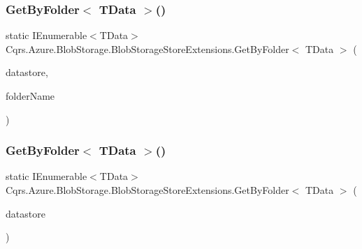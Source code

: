 \subsubsection{\texorpdfstring{Get\+By\+Folder$<$ T\+Data $>$()}{GetByFolder< TData >()}\hspace{0.1cm}{\footnotesize\ttfamily [1/2]}}
{\footnotesize\ttfamily static I\+Enumerable$<$T\+Data$>$ Cqrs.\+Azure.\+Blob\+Storage.\+Blob\+Storage\+Store\+Extensions.\+Get\+By\+Folder$<$ T\+Data $>$ (\begin{DoxyParamCaption}\item[{this \hyperlink{interfaceCqrs_1_1DataStores_1_1IDataStore}{I\+Data\+Store}$<$ T\+Data $>$}]{datastore,  }\item[{string}]{folder\+Name }\end{DoxyParamCaption})\hspace{0.3cm}{\ttfamily [static]}}

\mbox{\label{classCqrs_1_1Azure_1_1BlobStorage_1_1BlobStorageStoreExtensions_a71348a56844b38342f7d9e6d979fa3f6_a71348a56844b38342f7d9e6d979fa3f6}} 
\subsubsection{\texorpdfstring{Get\+By\+Folder$<$ T\+Data $>$()}{GetByFolder< TData >()}\hspace{0.1cm}{\footnotesize\ttfamily [2/2]}}
{\footnotesize\ttfamily static I\+Enumerable$<$T\+Data$>$ Cqrs.\+Azure.\+Blob\+Storage.\+Blob\+Storage\+Store\+Extensions.\+Get\+By\+Folder$<$ T\+Data $>$ (\begin{DoxyParamCaption}\item[{this \hyperlink{interfaceCqrs_1_1DataStores_1_1IDataStore}{I\+Data\+Store}$<$ T\+Data $>$}]{datastore }\end{DoxyParamCaption})\hspace{0.3cm}{\ttfamily [static]}}

